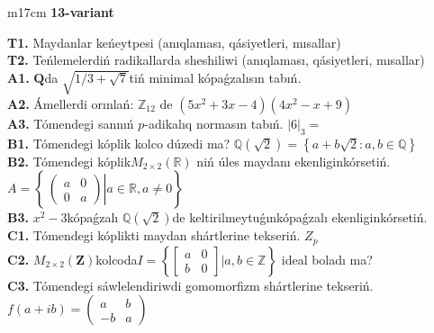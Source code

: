 \documentclass{article}
\begin{document}
\begin{tabular}{m{17cm}}
\textbf{13-variant}
\newline

\textbf{T1.} Maydanlar keńeytpesi (anıqlaması, qásiyetleri, mısallar) \\
\textbf{T2.} Teńlemelerdiń radikallarda sheshiliwi (anıqlaması, qásiyetleri, mısallar) \\
\textbf{A1.} \(\mathbf{Q}\)da \(\sqrt{1/3 + \sqrt{7}}\)tiń minimal kópaǵzalısın tabıń. \\
\textbf{A2.} Ámellerdi orınlań: \(\mathbb{Z}_{12}\) de \(\left( 5x^{2} + 3x - 4 \right)\left( 4x^{2} - x + 9 \right)\) \\
\textbf{A3.} Tómendegi sannıń \(p\)-adikalıq normasın tabıń. \(|6|_{3} =\) \\
\textbf{B1.} Tómendegi kóplik kolco dúzedi ma? \(\mathbb{Q}\left( \sqrt{2} \right) = \left\{ a + b\sqrt{2}:a,b \in \mathbb{Q} \right\}\) \\
\textbf{B2.} Tómendegi kóplik\(M_{2 \times 2}\left( \mathbb{R} \right)\) niń úles maydanı ekenliginkórsetiń. \(A = \left\{ \left. \ \begin{pmatrix}
a & 0 \\
0 & a
\end{pmatrix} \right|a\mathbb{\in R},a \neq 0 \right\}\) \\
\textbf{B3.} \(x^{2} - 3\)kópaǵzalı \(\mathbb{Q}(\sqrt{2})\)de keltirilmeytuǵınkópaǵzalı ekenliginkórsetiń. \\
\textbf{C1.} Tómendegi kóplikti maydan shártlerine tekseriń. \(Z_{p}\) \\
\textbf{C2.} \(M_{2 \times 2}\left( \mathbf{Z} \right)\)kolcoda\(I = \left\{ \begin{bmatrix}
a & 0 \\
b & 0
\end{bmatrix}|a,b\mathbb{\in Z} \right\}\) ideal boladı ma? \\
\textbf{C3.} Tómendegi sáwlelendiriwdi gomomorfizm shártlerine tekseriń. \(f(a + ib) = \begin{pmatrix}
a & b \\
 - b & a
\end{pmatrix}\) \\

\end{tabular}
\vspace{1cm}
\end{document}
